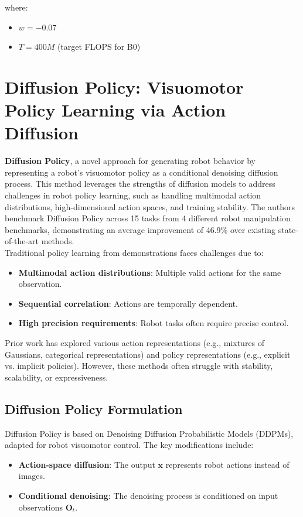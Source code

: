 \documentclass[12pt]{article}
\begin{document}
\begin{appendices}
where:
\begin{itemize}
    \item $w = -0.07$
    \item $T = 400M$ (target FLOPS for B0)
\end{itemize}

\section{Diffusion Policy: Visuomotor Policy Learning via Action Diffusion} \cite{diff_paper}
\label{app:diffusion}
\textbf{Diffusion Policy}, a novel approach for generating robot behavior by representing a robot's visuomotor policy as a conditional denoising diffusion process. This method leverages the strengths of diffusion models to address challenges in robot policy learning, such as handling multimodal action distributions, high-dimensional action spaces, and training stability. The authors benchmark Diffusion Policy across 15 tasks from 4 different robot manipulation benchmarks, demonstrating an average improvement of 46.9\% over existing state-of-the-art methods.\\
Traditional policy learning from demonstrations faces challenges due to:
\begin{itemize}
    \item \textbf{Multimodal action distributions}: Multiple valid actions for the same observation.
    \item \textbf{Sequential correlation}: Actions are temporally dependent.
    \item \textbf{High precision requirements}: Robot tasks often require precise control.
\end{itemize}

Prior work has explored various action representations (e.g., mixtures of Gaussians, categorical representations) and policy representations (e.g., explicit vs. implicit policies). However, these methods often struggle with stability, scalability, or expressiveness.

\subsection*{Diffusion Policy Formulation}
Diffusion Policy is based on Denoising Diffusion Probabilistic Models (DDPMs), adapted for robot visuomotor control. The key modifications include:
\begin{itemize}
    \item \textbf{Action-space diffusion}: The output \(\mathbf{x}\) represents robot actions instead of images.
    \item \textbf{Conditional denoising}: The denoising process is conditioned on input observations \(\mathbf{O}_t\).
\end{itemize}


\end{appendices}
\end{document}
